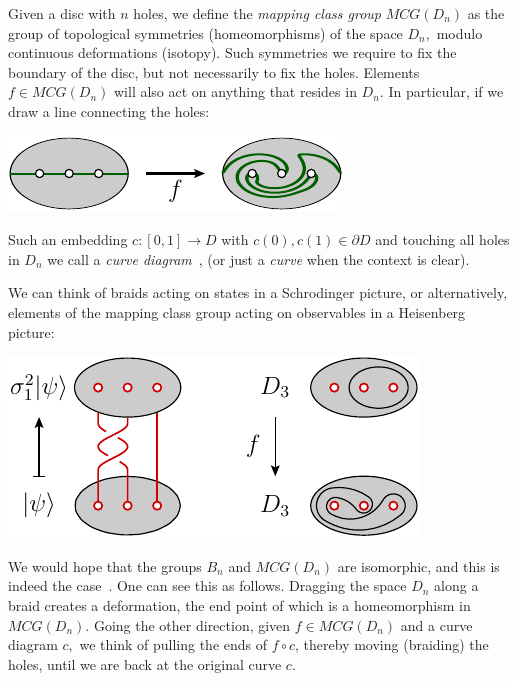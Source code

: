 \documentclass[aps, prl, letterpaper, twocolumn, superscriptaddress, notitlepage, 10pt]{revtex4-1}
\begin{document}
Given a disc with $n$ holes, we define the \emph{mapping
class group} $MCG(D_n)$ as the group of topological
symmetries (homeomorphisms) of the space $D_n,$
modulo continuous deformations (isotopy).
Such symmetries we require to fix the boundary
of the disc, but not necessarily to fix the holes.
Elements $f\in MCG(D_n)$ will also act on anything that
resides in $D_n.$ 
In particular, if we draw a line
connecting the holes:
\begin{center}
\includegraphics[]{pic-twist.pdf}
\end{center}

Such an embedding $c : [0, 1] \to D$ with $c(0), c(1) \in \partial D$
and touching all holes in $D_n$ we call a \emph{curve diagram}~\cite{Dehornoy2002},
(or just a \emph{curve} when the context is clear).

We can think of braids acting on states in a Schrodinger picture,
or alternatively, elements of the mapping class group acting on
observables in a Heisenberg picture:
\begin{center}
\includegraphics[]{pic-interaction.pdf}
\end{center}

We would hope that the groups $B_n$ and $MCG(D_n)$ are
isomorphic, and this is indeed the case~\cite{Kassel2010}.
One can see this as follows. Dragging the space $D_n$ along
a braid creates a deformation, the end point of which is a
homeomorphism in $MCG(D_n).$ Going the other direction,
given $f\in MCG(D_n)$ and a curve diagram $c,$ we think of
pulling the ends of $f\circ c$, thereby moving (braiding) the holes,
until we are back at the original curve $c.$

\end{document}
